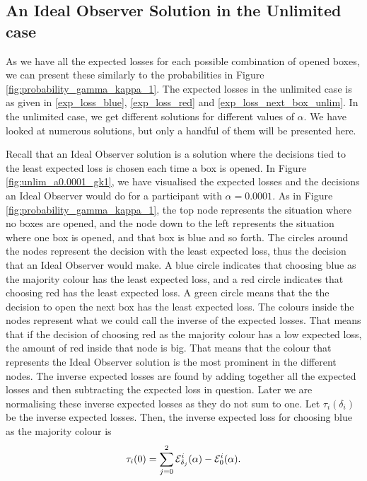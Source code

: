 \subsection{An Ideal Observer Solution in the Unlimited case}

As we have all the expected losses for each possible combination of opened boxes, we can present these similarly to the probabilities in Figure \ref{fig:probability_gamma_kappa_1}. 
The expected losses in the unlimited case is as given in \eqref{exp_loss_blue}, \eqref{exp_loss_red} and \eqref{exp_loss_next_box_unlim}. In the unlimited case, we get different solutions for different values of $\alpha$. We have looked at numerous solutions, but only a handful of them will be presented here. 

Recall that an Ideal Observer solution is a solution where the decisions tied to the least expected loss is chosen each time a box is opened. In Figure \ref{fig:unlim_a0.0001_gk1}, we have visualised the expected losses and the decisions an Ideal Observer would do for a participant with $\alpha=0.0001$. As in Figure \ref{fig:probability_gamma_kappa_1}, the top node represents the situation where no boxes are opened, and the node down to the left represents the situation where one box is opened, and that box is blue and so forth. The circles around the nodes represent the decision with the least expected loss, thus the decision that an Ideal Observer would make. A blue circle indicates that choosing blue as the majority colour has the least expected loss, and a red circle indicates that choosing red has the least expected loss. A green circle means that the the decision to open the next box has the least expected loss. The colours inside the nodes represent what we could call the inverse of the expected losses. That means that if the decision of choosing red as the majority colour has a low expected loss, the amount of red inside that node is big. That means that the colour that represents the Ideal Observer solution is the most prominent in the different nodes. The inverse expected losses are found by adding together all the expected losses and then subtracting the expected loss in question. Later we are normalising these inverse expected losses as they do not sum to one. Let $\tau_i(\delta_i)$ be the inverse expected losses. Then, the inverse expected loss for choosing blue as the majority colour is 
\begin{equation*}
    \tau_i(0) = \sum_{j=0}^2 \mathcal{E}_{\delta_j}^i(\alpha) - \mathcal{E}_0^i(\alpha).
\end{equation*}
